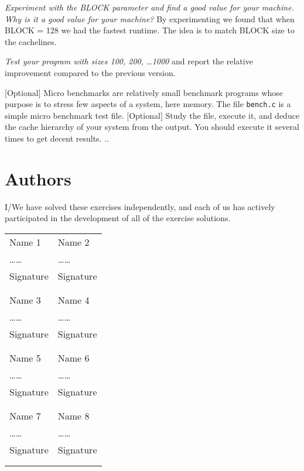 \documentclass{article}
\begin{document}
\begin{ExerciseList}
\Question
\emph{Experiment with the BLOCK parameter and find a good value for
  your machine. Why is it a good value for your machine?}
\Answer By experimenting we found that when BLOCK = 128 we had the fastest runtime. 
The idea is to match BLOCK size to the cachelines.

\Question
\emph{Test your program with sizes 100, 200, \dots 1000} and report
the relative improvement compared to the previous version.
\Answer %

\Exercise $[$Optional$]$ Micro benchmarks are relatively small
benchmark programs whose purpose is to stress few aspects of a
system, here memory. The file \texttt{bench.c} is a simple micro
benchmark test file.
\Question $[$Optional$]$
Study the file, execute it, and deduce the cache hierarchy of your
system from the output. You should execute it several times to get
decent results.
\Answer .. %

\end{ExerciseList}

\newpage
\section{Authors}
I/We have solved these exercises independently, and each of us has actively
participated in the development of all of the exercise solutions.
\vspace{1cm}

\noindent
\begin{tabular}{p{70mm}p{70mm}}

%
%

Name 1 & Name 2 \\
\dots\dotfill\dots & \dots\dotfill\dots \\
Signature & Signature \\
& \\
& \\

Name 3 & Name 4 \\
\dots\dotfill\dots & \dots\dotfill\dots \\
Signature & Signature \\
& \\
& \\

Name 5 & Name 6 \\
\dots\dotfill\dots & \dots\dotfill\dots \\
Signature & Signature \\
& \\
& \\

Name 7 & Name 8 \\
\dots\dotfill\dots & \dots\dotfill\dots \\
Signature & Signature \\
& \\
& \\
\end{tabular}
\end{document}
